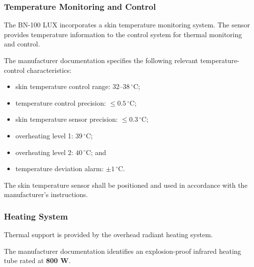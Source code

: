 
\subsubsection{Temperature Monitoring and Control}

The BN-100 LUX incorporates a skin temperature monitoring system.
The sensor provides temperature information to the control system
for thermal monitoring and control.

The manufacturer documentation specifies the following relevant
temperature-control characteristics:

\begin{itemize}
    \item skin temperature control range:
    \(32\text{--}38\,^\circ\mathrm{C}\);

    \item temperature control precision:
    \(\leq 0.5\,^\circ\mathrm{C}\);

    \item skin temperature sensor precision:
    \(\leq 0.3\,^\circ\mathrm{C}\);

    \item overheating level 1:
    \(39\,^\circ\mathrm{C}\);

    \item overheating level 2:
    \(40\,^\circ\mathrm{C}\); and

    \item temperature deviation alarm:
    \(\pm 1\,^\circ\mathrm{C}\).
\end{itemize}

The skin temperature sensor shall be positioned and used in
accordance with the manufacturer's instructions.


\subsubsection{Heating System}

Thermal support is provided by the overhead radiant heating system.

The manufacturer documentation identifies an explosion-proof
infrared heating tube rated at \textbf{800 W}.


